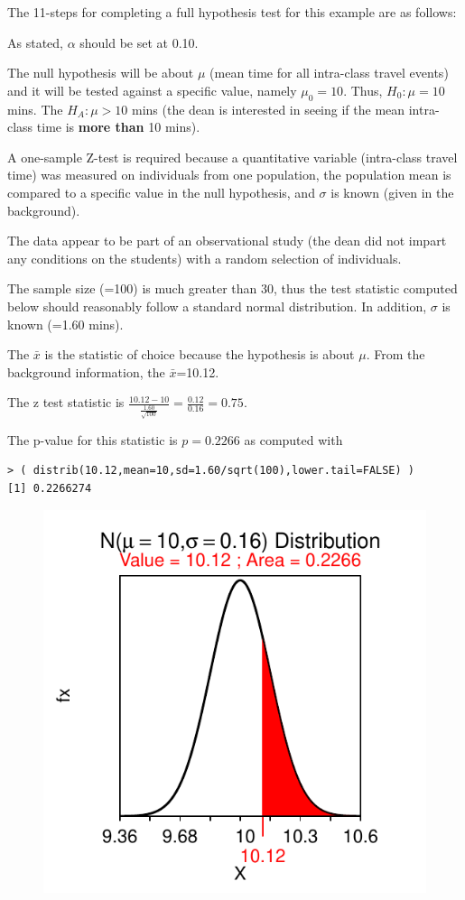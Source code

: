 \documentclass[10pt,openany]{book}\usepackage[]{graphicx}\usepackage[]{color}
\makeatletter
\newenvironment{kframe}{%
 \def\at@end@of@kframe{}%
 \ifinner\ifhmode%
  \def\at@end@of@kframe{\end{minipage}}%
  \begin{minipage}{\columnwidth}%
 \fi\fi%
 \def\FrameCommand##1{\hskip\@totalleftmargin \hskip-\fboxsep
 \colorbox{shadecolor}{##1}\hskip-\fboxsep
     \hskip-\linewidth \hskip-\@totalleftmargin \hskip\columnwidth}%
 \MakeFramed {\advance\hsize-\width
   \@totalleftmargin\z@ \linewidth\hsize
   \@setminipage}}%
 {\par\unskip\endMakeFramed%
 \at@end@of@kframe}
\newenvironment{knitrout}{}{} %
\makeatother
\begin{document}
The 11-steps  for completing a full hypothesis test for this example are as follows:
\begin{Enumerate}
  \item As stated, $\alpha$ should be set at 0.10.
  \item The null hypothesis will be about $\mu$ (mean time for all intra-class travel events) and it will be tested against a specific value, namely $\mu_{0}=10$.  Thus, $H_{0}:\mu=10$ mins.  The $H_{A}:\mu>10$ mins (the dean is interested in seeing if the mean intra-class time is \textbf{more than} 10 mins).
  \item A one-sample Z-test is required because a quantitative variable (intra-class travel time) was measured on individuals from one population, the population mean is compared to a specific value in the null hypothesis, and $\sigma$ is known (given in the background).
  \item The data appear to be part of an observational study (the dean did not impart any conditions on the students) with a random selection of individuals.
  \item The sample size (=100) is much greater than 30, thus the test statistic computed below should reasonably follow a standard normal distribution.  In addition, $\sigma$ is known (=1.60 mins).
  \item The $\bar{x}$ is the statistic of choice because the hypothesis is about $\mu$.  From the background information, the $\bar{x}$=10.12.
  \item The z test statistic is $\frac{10.12-10}{\frac{1.60}{\sqrt{100}}} = \frac{0.12}{0.16} = 0.75$.
  \item The p-value for this statistic is $p=0.2266$  as computed with
\begin{knitrout}
\color{fgcolor}\begin{kframe}
\begin{verbatim}
> ( distrib(10.12,mean=10,sd=1.60/sqrt(100),lower.tail=FALSE) )
[1] 0.2266274
\end{verbatim}
\end{kframe}\begin{figure}[!h]

{\centering \includegraphics[width=.3\linewidth]{Figs/Ex1Zpvalue-1} 

}
\end{figure}
\end{knitrout}
\end{Enumerate}
\end{document}

